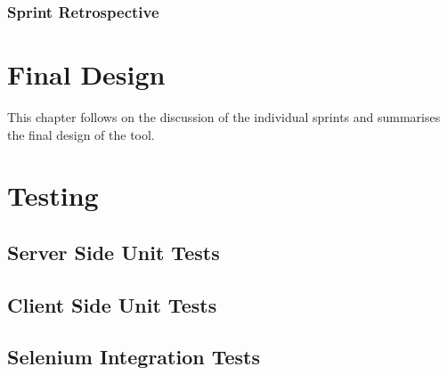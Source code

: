 \subsection{Sprint Retrospective}

\chapter{Final Design}

This chapter follows on the discussion of the individual sprints and summarises
the final design of the tool.

\chapter{Testing}

\section{Server Side Unit Tests}
\section{Client Side Unit Tests}
\section{Selenium Integration Tests}

%
%
%
%
%

